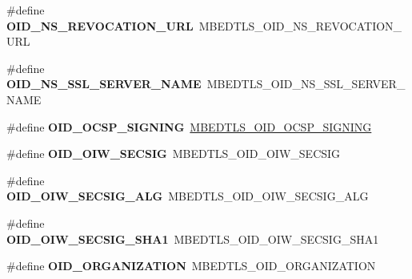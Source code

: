 \begin{DoxyCompactItemize}
\item 
\mbox{\label{compat-1_83_8h_a8e8251c504d5fae82cb7c59f8e85d7b3}} 
\#define {\bfseries O\+I\+D\+\_\+\+N\+S\+\_\+\+R\+E\+V\+O\+C\+A\+T\+I\+O\+N\+\_\+\+U\+RL}~M\+B\+E\+D\+T\+L\+S\+\_\+\+O\+I\+D\+\_\+\+N\+S\+\_\+\+R\+E\+V\+O\+C\+A\+T\+I\+O\+N\+\_\+\+U\+RL
\item 
\mbox{\label{compat-1_83_8h_a140448fdb31691fce7bc4488bafbac3c}} 
\#define {\bfseries O\+I\+D\+\_\+\+N\+S\+\_\+\+S\+S\+L\+\_\+\+S\+E\+R\+V\+E\+R\+\_\+\+N\+A\+ME}~M\+B\+E\+D\+T\+L\+S\+\_\+\+O\+I\+D\+\_\+\+N\+S\+\_\+\+S\+S\+L\+\_\+\+S\+E\+R\+V\+E\+R\+\_\+\+N\+A\+ME
\item 
\mbox{\label{compat-1_83_8h_aec2ececc47079440c7bc3c024516f593}} 
\#define {\bfseries O\+I\+D\+\_\+\+O\+C\+S\+P\+\_\+\+S\+I\+G\+N\+I\+NG}~\mbox{\hyperlink{oid_8h_aad03a9c85a0c3f922095e3cf6fb7d9c4}{M\+B\+E\+D\+T\+L\+S\+\_\+\+O\+I\+D\+\_\+\+O\+C\+S\+P\+\_\+\+S\+I\+G\+N\+I\+NG}}
\item 
\mbox{\label{compat-1_83_8h_a19017338b914b7512bc685c38b5349fc}} 
\#define {\bfseries O\+I\+D\+\_\+\+O\+I\+W\+\_\+\+S\+E\+C\+S\+IG}~M\+B\+E\+D\+T\+L\+S\+\_\+\+O\+I\+D\+\_\+\+O\+I\+W\+\_\+\+S\+E\+C\+S\+IG
\item 
\mbox{\label{compat-1_83_8h_a92faf86a534a95db58fcf6ea47b2b906}} 
\#define {\bfseries O\+I\+D\+\_\+\+O\+I\+W\+\_\+\+S\+E\+C\+S\+I\+G\+\_\+\+A\+LG}~M\+B\+E\+D\+T\+L\+S\+\_\+\+O\+I\+D\+\_\+\+O\+I\+W\+\_\+\+S\+E\+C\+S\+I\+G\+\_\+\+A\+LG
\item 
\mbox{\label{compat-1_83_8h_aeff120691691d3875a336684c165b0c3}} 
\#define {\bfseries O\+I\+D\+\_\+\+O\+I\+W\+\_\+\+S\+E\+C\+S\+I\+G\+\_\+\+S\+H\+A1}~M\+B\+E\+D\+T\+L\+S\+\_\+\+O\+I\+D\+\_\+\+O\+I\+W\+\_\+\+S\+E\+C\+S\+I\+G\+\_\+\+S\+H\+A1
\item 
\mbox{\label{compat-1_83_8h_affbfc37a57f282fd62a6d0176d7b0500}} 
\#define {\bfseries O\+I\+D\+\_\+\+O\+R\+G\+A\+N\+I\+Z\+A\+T\+I\+ON}~M\+B\+E\+D\+T\+L\+S\+\_\+\+O\+I\+D\+\_\+\+O\+R\+G\+A\+N\+I\+Z\+A\+T\+I\+ON
\item 
\mbox{\label{compat-1_83_8h_aa2bce4550293376342972b70ef659ed8}} 

\end{DoxyCompactItemize}
